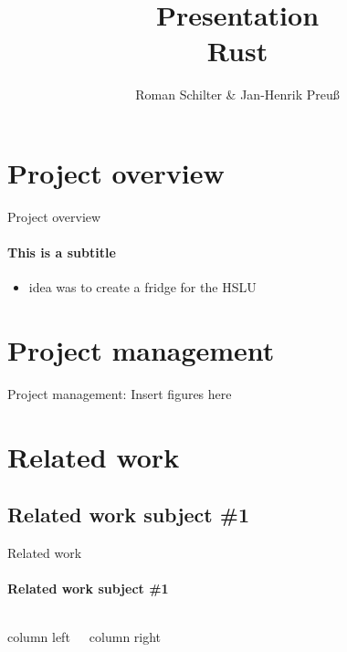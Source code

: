 \documentclass{beamer}
\title[PCP-Rust]{Presentation\\ Rust}
\author[Schilter \& Preuß]{Roman Schilter \& Jan-Henrik Preuß}
\begin{document}
\typesetFrontSlides


\section{Project overview}


\begin{frame}{Project overview}
	\framesubtitle{This is a subtitle}
	\begin{itemize}
		\item idea was to create a fridge for the HSLU
	\end{itemize}
	
\end{frame}

\section{Project management}


\begin{frame}{Project management:}
    Insert figures here
    
\end{frame}

\section{Related work}

\subsection{Related work subject \#1}

\begin{frame}{Related work}
    \framesubtitle{Related work subject \#1}
    \begin{columns}[T]

            column left
        
            column right
    \end{columns}
    
	
\end{frame}
\end{document}
